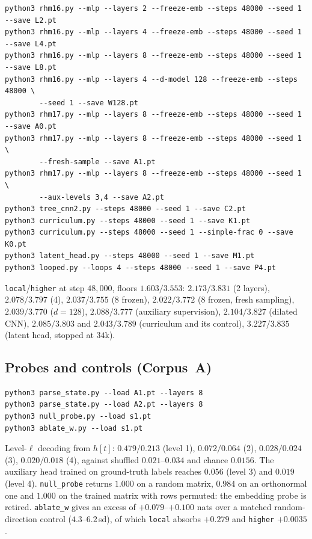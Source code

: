 \documentclass[11pt,a4paper]{article}
\theoremstyle{plain}
\theoremstyle{definition}
\begin{document}
\begin{verbatim}
python3 rhm16.py --mlp --layers 2 --freeze-emb --steps 48000 --seed 1 --save L2.pt
python3 rhm16.py --mlp --layers 4 --freeze-emb --steps 48000 --seed 1 --save L4.pt
python3 rhm16.py --mlp --layers 8 --freeze-emb --steps 48000 --seed 1 --save L8.pt
python3 rhm16.py --mlp --layers 4 --d-model 128 --freeze-emb --steps 48000 \
        --seed 1 --save W128.pt
python3 rhm17.py --mlp --layers 8 --freeze-emb --steps 48000 --seed 1 --save A0.pt
python3 rhm17.py --mlp --layers 8 --freeze-emb --steps 48000 --seed 1 \
        --fresh-sample --save A1.pt
python3 rhm17.py --mlp --layers 8 --freeze-emb --steps 48000 --seed 1 \
        --aux-levels 3,4 --save A2.pt
python3 tree_cnn2.py --steps 48000 --seed 1 --save C2.pt
python3 curriculum.py --steps 48000 --seed 1 --save K1.pt
python3 curriculum.py --steps 48000 --seed 1 --simple-frac 0 --save K0.pt
python3 latent_head.py --steps 48000 --seed 1 --save M1.pt
python3 looped.py --loops 4 --steps 48000 --seed 1 --save P4.pt
\end{verbatim}
\texttt{local}/\texttt{higher} at step $48{,}000$, floors $1.603/3.553$:
$2.173/3.831$ (2 layers), $2.078/3.797$ (4), $2.037/3.755$ (8 frozen),
$2.022/3.772$ (8 frozen, fresh sampling), $2.039/3.770$ ($d{=}128$),
$2.088/3.777$ (auxiliary supervision), $2.104/3.827$ (dilated CNN),
$2.085/3.803$ and $2.043/3.789$ (curriculum and its control),
$3.227/3.835$ (latent head, stopped at $34$k).

\subsection*{Probes and controls (Corpus~A)}

\begin{verbatim}
python3 parse_state.py --load A1.pt --layers 8
python3 parse_state.py --load A2.pt --layers 8
python3 null_probe.py --load s1.pt
python3 ablate_w.py --load s1.pt
\end{verbatim}
Level-$\ell$ decoding from $h[t]$: $0.479/0.213$ (level 1),
$0.072/0.064$ (2), $0.028/0.024$ (3), $0.020/0.018$ (4), against shuffled
$0.021$--$0.034$ and chance $0.0156$. The auxiliary head trained on
ground-truth labels reaches $0.056$ (level 3) and $0.019$ (level 4).
\texttt{null\_probe} returns $1.000$ on a random matrix, $0.984$ on an
orthonormal one and $1.000$ on the trained matrix with rows permuted: the
embedding probe is retired. \texttt{ablate\_w} gives an excess of
$+0.079$--$+0.100$ nats over a matched random-direction control
($4.3$--$6.2$\,sd), of which \texttt{local} absorbs $+0.279$ and
\texttt{higher} $+0.0035$.
\end{document}
